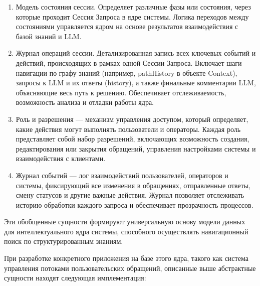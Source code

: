 \begin{enumerate}[label=\arabic*.]
    \item Модель состояния сессии. Определяет различные фазы или состояния, через которые проходит Сессия Запроса в ядре системы. Логика переходов между состояниями управляется ядром на основе результатов взаимодействия с базой знаний и LLM.
    
    \item Журнал операций сессии. Детализированная запись всех ключевых событий и действий, происходящих в рамках одной Сессии Запроса. Включает шаги навигации по графу знаний (например, pathHistory в объекте Context), запросы к LLM и их ответы (history), а также финальные комментарии LLM, объясняющие весь путь к решению. Обеспечивает отслеживаемость, возможность анализа и отладки работы ядра.
    
    \item Роль и разрешения — механизм управления доступом, который определяет, какие действия могут выполнять пользователи и операторы. Каждая роль представляет собой набор разрешений, включающих возможность создания, редактирования или закрытия обращений, управления настройками системы и взаимодействия с клиентами.
    
    \item Журнал событий — лог взаимодействий пользователей, операторов и системы, фиксирующий все изменения в обращениях, отправленные ответы, смену статусов и другие важные действия. Журнал позволяет отслеживать историю обработки каждого запроса и обеспечивает прозрачность процессов.
    
\end{enumerate}

Эти обобщенные сущности формируют универсальную основу модели данных для интеллектуального ядра системы, способного осуществлять навигационный поиск по структурированным знаниям.

При разработке конкретного приложения на базе этого ядра, такого как система управления потоками пользовательских обращений, описанные выше абстрактные сущности находят следующая имплементация:

